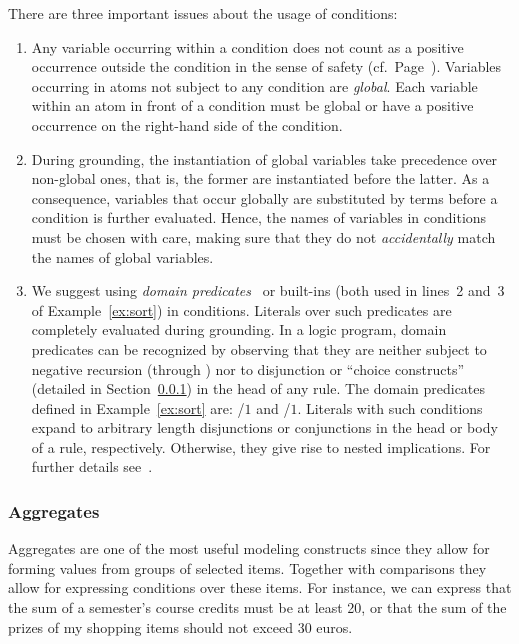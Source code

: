 \begin{note}
There are three important issues about the usage of conditions:
\begin{enumerate}
%
\item
Any variable occurring within a condition
does not count as a positive occurrence outside the condition
in the sense of safety (cf.\ Page~\pageref{pg:safe}).
Variables occurring in atoms not subject to any condition are \emph{global}.
Each variable within an atom in front of a condition
must be global or have a positive occurrence on the right-hand side of
the condition.
%
\item
During grounding,
the instantiation of global variables take precedence over non-global ones,
that is, the former are instantiated before the latter.
As a consequence, variables that occur globally are substituted by terms
before a condition is further evaluated.
Hence, the names of variables in conditions must be chosen with care,
making sure that they do not \emph{accidentally} match the names of global variables.
%
\item
We suggest using \emph{domain predicates}~\cite{lparseManual}
or built-ins (both used in lines~2 and~3  of Example~\ref{ex:sort})
in conditions.
%
%
\label{pg:domain}%
Literals over such predicates are completely evaluated during grounding.
In a logic program, domain predicates can be recognized by observing
that they are neither subject to negative recursion (through )
nor to disjunction or ``choice constructs'' (detailed in Section~\ref{subsec:gringo:aggregate})
in the head of any rule.
The domain predicates defined in Example~\ref{ex:sort} are:
/$1$ and /$1$.
Literals with such conditions expand to arbitrary length disjunctions or conjunctions in the head or body of a rule, respectively.
Otherwise, they give rise to nested implications.
For further details see~\cite{haliya14a}.
\end{enumerate}
\end{note}

\subsubsection{Aggregates}\label{subsec:gringo:aggregate}

Aggregates are one of the most useful modeling constructs since they allow for forming values from groups of selected items.
Together with comparisons they allow for expressing conditions over these items.
For instance, we can express that the sum of a semester's course credits must be at least 20,
or that the sum of the prizes of my shopping items should not exceed 30 euros.

